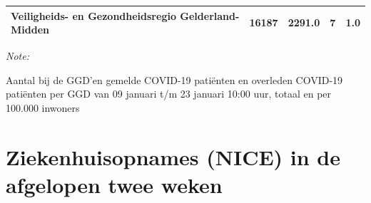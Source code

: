 \documentclass[
  english,
  man,floatsintext]{apa6}
\begin{document}
\begin{table}
\begin{threeparttable}
\begin{tabular}{lrrrr}
Veiligheids- en Gezondheidsregio Gelderland-Midden & 16187 & 2291.0 & 7 & 1.0\\
\bottomrule
\end{tabular}
\begin{tablenotes}
\item \textit{Note: } 
\item Aantal bij de GGD’en gemelde COVID-19 patiënten en overleden COVID-19 patiënten per GGD van 09 januari t/m 23 januari 10:00 uur, totaal en per 100.000 inwoners
\end{tablenotes}
\end{threeparttable}
\endgroup{}
\end{table}

\newpage

\hypertarget{ziekenhuisopnames-nice-in-de-afgelopen-twee-weken}{%
\section{Ziekenhuisopnames (NICE) in de afgelopen twee weken}\label{ziekenhuisopnames-nice-in-de-afgelopen-twee-weken}}
\end{document}
